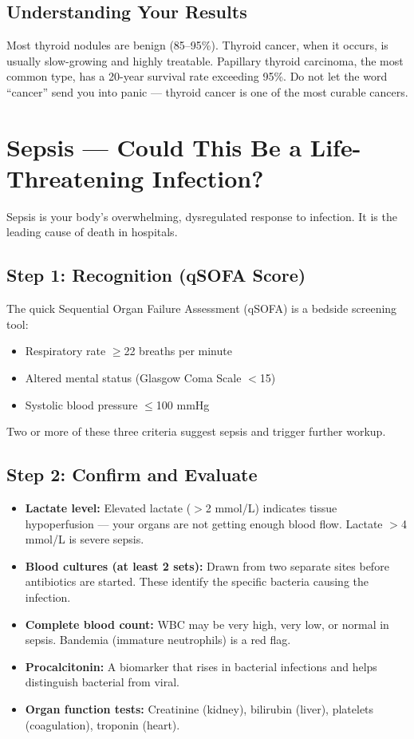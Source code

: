 \subsection{Understanding Your Results}

Most thyroid nodules are benign (85--95\%). Thyroid cancer, when it occurs, is usually slow-growing and highly treatable. Papillary thyroid carcinoma, the most common type, has a 20-year survival rate exceeding 95\%. Do not let the word ``cancer'' send you into panic --- thyroid cancer is one of the most curable cancers.

\clearpage
\section{Sepsis --- Could This Be a Life-Threatening Infection?}

Sepsis is your body's overwhelming, dysregulated response to infection. It is the leading cause of death in hospitals.

\subsection{Step 1: Recognition (qSOFA Score)}

The quick Sequential Organ Failure Assessment (qSOFA) is a bedside screening tool:
\begin{itemize}
    \item Respiratory rate $\geq$22 breaths per minute
    \item Altered mental status (Glasgow Coma Scale $<$15)
    \item Systolic blood pressure $\leq$100 mmHg
\end{itemize}

Two or more of these three criteria suggest sepsis and trigger further workup.

\subsection{Step 2: Confirm and Evaluate}

\begin{itemize}
    \item \textbf{Lactate level:} Elevated lactate ($>$2 mmol/L) indicates tissue hypoperfusion --- your organs are not getting enough blood flow. Lactate $>$4 mmol/L is severe sepsis.
    \item \textbf{Blood cultures (at least 2 sets):} Drawn from two separate sites before antibiotics are started. These identify the specific bacteria causing the infection.
    \item \textbf{Complete blood count:} WBC may be very high, very low, or normal in sepsis. Bandemia (immature neutrophils) is a red flag.
    \item \textbf{Procalcitonin:} A biomarker that rises in bacterial infections and helps distinguish bacterial from viral.
    \item \textbf{Organ function tests:} Creatinine (kidney), bilirubin (liver), platelets (coagulation), troponin (heart).
\end{itemize}

